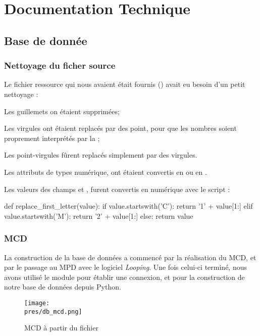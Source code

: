 \chapter{Documentation Technique}

    \section{Base de donnée}
        \subsection{Nettoyage du ficher source}
            Le fichier ressource qui nous avaient était fournis () avait eu besoin d'un petit nettoyage :
            \begin{diamond-enum}
                \item Les guillemets on étaient supprimées;
                \item Les virgules ont étaient replacés par des point, pour que les nombres soient proprement interprétés par la ;
                \item Les point-virgules fûrent replacés simplement par des virgules.
                \item Les attributs de types numérique, ont étaient convertis en  ou en .
                \item Les valeurs des champs  et , furent convertis en numérique avec le script :
                \begin{pybox}
                    def replace_first_letter(value):
                        if value.startswith('C'):
                            return '1' + value[1:]
                        elif value.startswith('M'):
                            return '2' + value[1:]
                        else:
                            return value
                \end{pybox}
            \end{diamond-enum}

        \subsection{MCD}
        La construction de la base de données a commencé par la réalisation du MCD, et par le passage au MPD avec le logiciel \emph{Looping}.
        Une fois celui-ci terminé, nous avons utilisé le module  pour établir une connexion, et pour la construction de notre base de données depuis Python.
        \begin{figure}[ht]
            \centering
            \texttt{[image: \\pres/db\_mcd.png]} %
            \caption{MCD à partir du fichier }
        \end{figure}